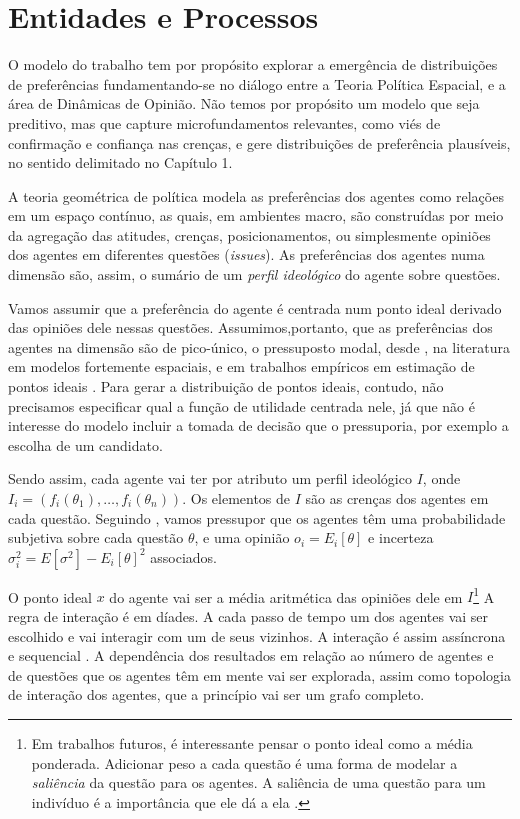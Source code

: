 
\section{Entidades e Processos}


O modelo do trabalho tem por propósito explorar a emergência de distribuições de
preferências fundamentando-se no diálogo entre a Teoria Política Espacial, e a
área de Dinâmicas de Opinião. Não temos por propósito um modelo que seja
preditivo, mas que capture microfundamentos relevantes, como viés de confirmação
e confiança nas crenças, e gere distribuições de
preferência plausíveis, no sentido delimitado no Capítulo 1.

A teoria geométrica de política modela as preferências dos agentes como relações
em um espaço contínuo, as quais, em ambientes macro, são construídas por meio da
agregação das atitudes, crenças, posicionamentos, ou simplesmente opiniões dos
agentes em diferentes questões (\textit{issues}). As preferências dos agentes
numa dimensão são, assim, o sumário de um \textit{perfil ideológico} do agente
sobre questões.

Vamos assumir que a preferência do agente é centrada num ponto ideal derivado
das opiniões dele nessas questões. Assumimos,portanto, que as preferências dos
agentes na dimensão são de pico-único, o pressuposto modal, desde
, na literatura em modelos fortemente espaciais, e
em trabalhos empíricos em estimação de pontos ideais \cite{carroll2013structure,
  armstrong2014analyzing, schofield1998nash}. Para gerar a distribuição de
pontos ideais, contudo, não precisamos especificar qual a função de utilidade
centrada nele, já que não é interesse do modelo incluir a tomada de decisão que
o pressuporia, por exemplo a escolha de um candidato.

Sendo assim, cada agente vai ter por atributo um perfil ideológico \(I\), onde
\(I_i = (f_i(\theta_1), \ldots, f_i(\theta_n)) \). Os elementos de \(I\) são as crenças dos
agentes em cada questão. Seguindo , vamos pressupor
que os agentes têm uma probabilidade subjetiva sobre cada questão \(\theta\), e uma
opinião \( o_i = E_i[\theta]\) e incerteza \( \sigma_i^2 = E[\sigma^2] - E_ i[\theta]^2\)
associados.

O ponto ideal \(x\) do agente vai ser a média aritmética das opiniões dele em
\(I\)\footnote{Em trabalhos futuros, é interessante pensar o ponto ideal como a
média ponderada. Adicionar peso a cada questão é uma forma de modelar a
\textit{saliência} da questão para os agentes. A saliência de uma questão para
um indivíduo é a importância que ele dá a ela \cite{munger2015choosing}.} A
regra de interação é em díades. A cada passo de tempo um dos agentes vai ser
escolhido e vai interagir com um de seus vizinhos. A interação é assim
assíncrona e sequencial \cite{wilensky2015introduction}. A dependência dos
resultados em relação ao número de agentes e de questões que os agentes têm em
mente vai ser explorada, assim como topologia de interação dos agentes, que a
princípio vai ser um grafo completo.


